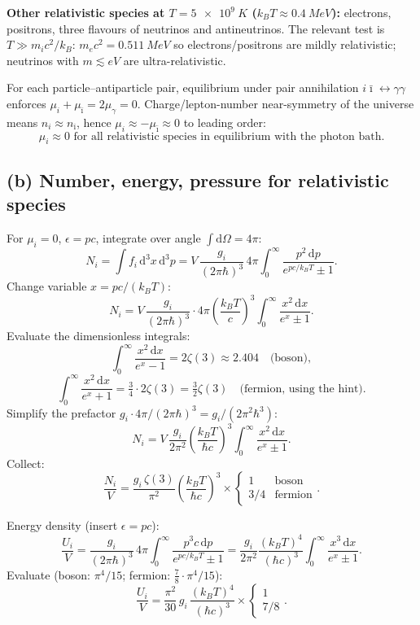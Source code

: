 \documentclass[11pt]{article}
\newcommand{\de}{\mathrm{d}}
\begin{document}
\textbf{Other relativistic species at $T = \SI{5e9}{K}$ ($k_B T \approx \SI{0.4}{MeV}$):} electrons, positrons, three flavours of neutrinos and antineutrinos. The relevant test is $T \gg m_i c^2/k_B$: $m_e c^2 = \SI{0.511}{MeV}$ so electrons/positrons are mildly relativistic; neutrinos with $m\lesssim\si{eV}$ are ultra-relativistic.

For each particle--antiparticle pair, equilibrium under pair annihilation $i\bar\imath\leftrightarrow\gamma\gamma$ enforces $\mu_i + \mu_{\bar\imath} = 2\mu_\gamma = 0$. Charge/lepton-number near-symmetry of the universe means $n_i\approx n_{\bar\imath}$, hence $\mu_i \approx -\mu_{\bar\imath} \approx 0$ to leading order:
\[
\boxed{\;\mu_i \approx 0 \text{ for all relativistic species in equilibrium with the photon bath.}\;}
\]

\subsection*{(b) Number, energy, pressure for relativistic species}

For $\mu_i = 0$, $\epsilon = pc$, integrate over angle $\int\de\Omega = 4\pi$:
\[
N_i = \int f_i\,\de^3 x\,\de^3 p = V\,\frac{g_i}{(2\pi\hbar)^3}\,4\pi\int_0^\infty\frac{p^2\,\de p}{e^{pc/k_B T}\pm 1}.
\]
Change variable $x = pc/(k_B T)$:
\[
N_i = V\,\frac{g_i}{(2\pi\hbar)^3}\cdot 4\pi\left(\frac{k_B T}{c}\right)^3\int_0^\infty\frac{x^2\,\de x}{e^x \pm 1}.
\]
Evaluate the dimensionless integrals:
\[
\int_0^\infty\frac{x^2\,\de x}{e^x - 1} = 2\zeta(3) \approx 2.404\quad\text{(boson)},
\]
\[
\int_0^\infty\frac{x^2\,\de x}{e^x + 1} = \tfrac34\cdot 2\zeta(3) = \tfrac32\zeta(3)\quad\text{(fermion, using the hint)}.
\]
Simplify the prefactor $g_i \cdot 4\pi/(2\pi\hbar)^3 = g_i/(2\pi^2\hbar^3)$:
\[
N_i = V\,\frac{g_i}{2\pi^2}\left(\frac{k_B T}{\hbar c}\right)^3\!\!\int_0^\infty\frac{x^2\,\de x}{e^x \pm 1}.
\]
Collect:
\[
\boxed{\;\frac{N_i}{V} = \frac{g_i\,\zeta(3)}{\pi^2}\left(\frac{k_B T}{\hbar c}\right)^3\times\begin{cases}1 & \text{boson}\\ 3/4 & \text{fermion}\end{cases}.\;}
\label{eq:Ni}
\]

Energy density (insert $\epsilon = pc$):
\[
\frac{U_i}{V} = \frac{g_i}{(2\pi\hbar)^3}\,4\pi\int_0^\infty\frac{p^3 c\,\de p}{e^{pc/k_B T}\pm 1} = \frac{g_i}{2\pi^2}\frac{(k_B T)^4}{(\hbar c)^3}\int_0^\infty\frac{x^3\,\de x}{e^x\pm 1}.
\]
Evaluate (boson: $\pi^4/15$; fermion: $\tfrac78\cdot\pi^4/15$):
\[
\boxed{\;\frac{U_i}{V} = \frac{\pi^2}{30}\,g_i\,\frac{(k_B T)^4}{(\hbar c)^3}\times\begin{cases}1\\ 7/8\end{cases}.\;}
\label{eq:Ui}
\]
\end{document}
